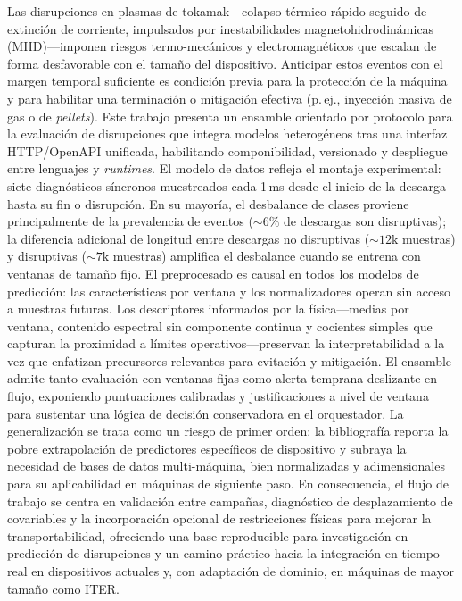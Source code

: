 Las disrupciones en plasmas de tokamak—colapso térmico rápido seguido de extinción de corriente, impulsados por inestabilidades magnetohidrodinámicas (MHD)—imponen riesgos termo-mecánicos y electromagnéticos que escalan de forma desfavorable con el tamaño del dispositivo. 
Anticipar estos eventos con el margen temporal suficiente es condición previa para la protección de la máquina y para habilitar una terminación o mitigación efectiva (p.\,ej., inyección masiva de gas o de \emph{pellets}). 
Este trabajo presenta un ensamble orientado por protocolo para la evaluación de disrupciones que integra modelos heterogéneos tras una interfaz \acs{HTTP}/OpenAPI unificada, habilitando componibilidad, versionado y despliegue entre lenguajes y \emph{runtimes}. 
El modelo de datos refleja el montaje experimental: siete diagnósticos síncronos muestreados cada 1\,ms desde el inicio de la descarga hasta su fin o disrupción. En su mayoría, el desbalance de clases proviene principalmente de la prevalencia de eventos (\(\sim\!6\%\) de descargas son disruptivas); la diferencia adicional de longitud entre descargas no disruptivas (\(\sim\!12\mathrm{k}\) muestras) y disruptivas (\(\sim\!7\mathrm{k}\) muestras) amplifica el desbalance cuando se entrena con ventanas de tamaño fijo. 
El preprocesado es causal en todos los modelos de predicción: las características por ventana y los normalizadores operan sin acceso a muestras futuras. Los descriptores informados por la física—medias por ventana, contenido espectral sin componente continua y cocientes simples que capturan la proximidad a límites operativos—preservan la interpretabilidad a la vez que enfatizan precursores relevantes para evitación y mitigación. 
El ensamble admite tanto evaluación con ventanas fijas como alerta temprana deslizante en flujo, exponiendo puntuaciones calibradas y justificaciones a nivel de ventana para sustentar una lógica de decisión conservadora en el orquestador. 
La generalización se trata como un riesgo de primer orden: la bibliografía reporta la pobre extrapolación de predictores específicos de dispositivo y subraya la necesidad de bases de datos multi-máquina, bien normalizadas y adimensionales para su aplicabilidad en máquinas de siguiente paso. 
En consecuencia, el flujo de trabajo se centra en validación entre campañas, diagnóstico de desplazamiento de covariables y la incorporación opcional de restricciones físicas para mejorar la transportabilidad, ofreciendo una base reproducible para investigación en predicción de disrupciones y un camino práctico hacia la integración en tiempo real en dispositivos actuales y, con adaptación de dominio, en máquinas de mayor tamaño como \ac{ITER}.
